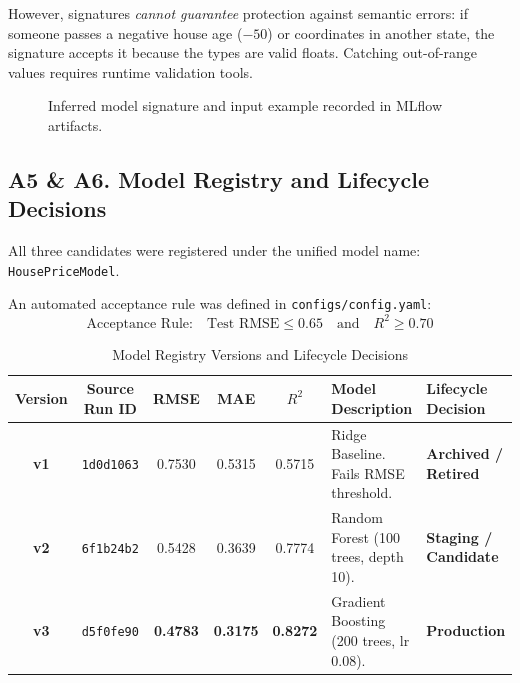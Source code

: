 \documentclass[11pt,a4paper]{article}
\begin{document}
However, signatures \textit{cannot guarantee} protection against semantic errors: if someone passes a negative house age ($-50$) or coordinates in another state, the signature accepts it because the types are valid floats. Catching out-of-range values requires runtime validation tools.

\begin{figure}[htbp]
\centering
{}
\caption{Inferred model signature and input example recorded in MLflow artifacts.}
\end{figure}

\subsection{A5 \& A6. Model Registry and Lifecycle Decisions}
All three candidates were registered under the unified model name: \texttt{HousePriceModel}. 

An automated acceptance rule was defined in \texttt{configs/config.yaml}:
\[
\text{Acceptance Rule:} \quad \text{Test RMSE} \le 0.65 \quad \text{and} \quad R^2 \ge 0.70
\]

\begin{table}[htbp]
\centering
\small
\caption{Model Registry Versions and Lifecycle Decisions}
\begin{tabularx}{\textwidth}{c c c c c X l}
\toprule
\textbf{Version} & \textbf{Source Run ID} & \textbf{RMSE} & \textbf{MAE} & \textbf{$R^2$} & \textbf{Model Description} & \textbf{Lifecycle Decision} \\
\midrule
\textbf{v1} & \texttt{1d0d1063} & 0.7530 & 0.5315 & 0.5715 & Ridge Baseline. Fails RMSE threshold. & \textbf{Archived / Retired} \\
\textbf{v2} & \texttt{6f1b24b2} & 0.5428 & 0.3639 & 0.7774 & Random Forest (100 trees, depth 10). & \textbf{Staging / Candidate} \\
\textbf{v3} & \texttt{d5f0fe90} & \textbf{0.4783} & \textbf{0.3175} & \textbf{0.8272} & Gradient Boosting (200 trees, lr 0.08). & \textbf{Production} \\
\bottomrule
\end{tabularx}
\end{table}
\end{document}

